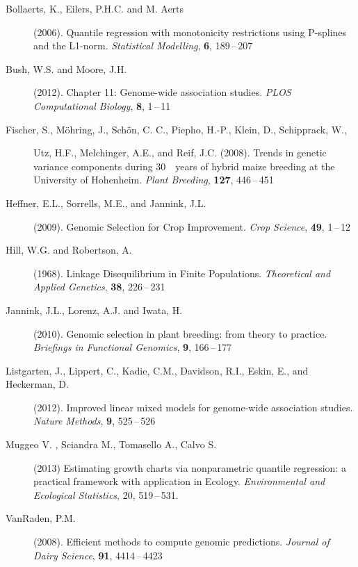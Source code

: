 \documentclass[twoside]{report}
\begin{document}
\begin{description}
\item[Bollaerts, K., Eilers, P.H.C. and M. Aerts] (2006). Quantile regression with monotonicity restrictions using P-splines and the L1-norm. {\it Statistical Modelling}, {\bf 6}, 189\,--\,207 
\item[Bush, W.S. and Moore, J.H.] (2012).
		Chapter 11: Genome-wide association studies.
		{\it PLOS Computational Biology}, {\bf 8}, 1\,--\,11
\item[Fischer, S., M\"{o}hring, J., Sch\"{o}n, C. C., Piepho, H.-P., Klein, D., Schipprack, W.,] {Utz, H.F., Melchinger, A.E., and Reif, J.C.} (2008).
		Trends in genetic variance components during 30 years of hybrid maize breeding at the University of Hohenheim.
		{\it Plant Breeding}, {\bf 127}, 446\,--\,451
\item[Heffner, E.L., Sorrells, M.E., and Jannink, J.L.] (2009).
		Genomic Selection for Crop Improvement. 
		{\it Crop Science}, {\bf 49}, 1\,--\,12
\item[Hill, W.G. and Robertson, A.] (1968).
		Linkage Disequilibrium in Finite Populations.
		{\it Theoretical and Applied Genetics}, {\bf 38}, 226\,--\,231		
\item[Jannink, J.L., Lorenz, A.J. and Iwata, H.] (2010).
		Genomic selection in plant breeding: from theory to practice.
		{\it Briefings in Functional Genomics}, {\bf 9}, 166\,--\,177
\item[Listgarten, J., Lippert, C., Kadie, C.M., Davidson, R.I., Eskin, E., and Heckerman, D.] (2012). 
		Improved linear mixed models for genome-wide association studies.
		{\it Nature Methods}, {\bf 9}, 525\,--\,526
		
\item [Muggeo V. , Sciandra M., Tomasello A., Calvo S.] (2013) Estimating growth charts via 		
		nonparametric quantile regression: a practical framework with application in Ecology. 
		{\it Environmental and Ecological Statistics}, 20, 519\,--\,531. 		
\item[VanRaden, P.M.] (2008).
		Efficient methods to compute genomic predictions.
		{\it Journal of Dairy Science}, {\bf 91}, 4414\,--\,4423
\end{description}
\end{document}

